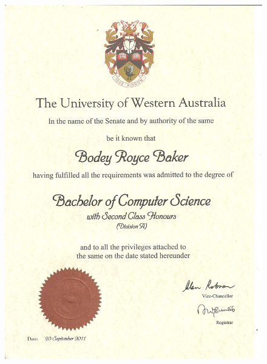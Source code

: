 \documentclass[10pt, a4paper]{report}
\begin{document}
\begin{figure}[h!]
   \centering
   \includegraphics[height=1.08\vsize]{images/a_deg_cs_honours.jpg} 
\end{figure}
\end{document}
